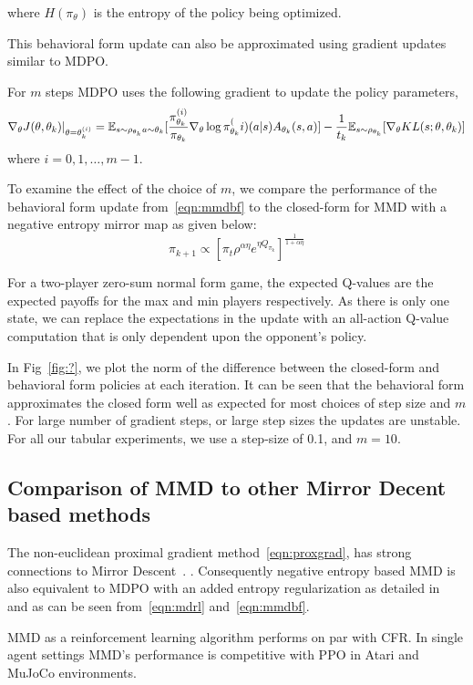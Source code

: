 where $H(\pi_\theta)$ is the entropy of the policy
being optimized.

This behavioral form update can also be approximated using gradient updates similar to MDPO. 

For $m$ steps MDPO uses the following gradient to update the policy parameters, 
\begin{equation}
	\label{eqn:mdpograd}
	\nabla_{\theta} J(\theta, \theta_k)|_{\theta = \theta_k^{(i)}} = \mathbb{E}_{s \sim \rho_{\theta_k} \\ a \sim \theta_k} 
	[\frac{\pi_{\theta_k}^{(i)}}{\pi_{\theta_k}} \nabla_{\theta} \log \pi_{\theta_k}^(i) (a|s) A_{\theta_k}(s,a)] - 
	\frac{1}{t_k} \mathbb{E}_{s \sim \rho_{\theta_k}} [\nabla_\theta KL(s; \theta, \theta_k)]
\end{equation}
where $i=0,1,\ldots,m-1$.

To examine the effect of the choice of $m$, we compare the performance of the behavioral form update from~\ref{eqn:mmdbf}  
to the closed-form for MMD with a negative entropy mirror map as given below:
$$\pi_{k+1} \propto [\pi_t \rho^{\alpha \eta} e^{\eta Q_{\pi_k}}]^{\frac{1}{1+\alpha \eta}}$$

For a two-player zero-sum normal form game, the expected Q-values are the expected payoffs for the max and min players respectively.
As there is only one state, we can replace the expectations in the update with an all-action Q-value computation that is only dependent 
upon the opponent's policy. 

In Fig~\ref{fig:?}, we plot the norm of the difference between the closed-form and behavioral form policies at each iteration. 
It can be seen that the behavioral form approximates the closed form well as expected for most choices of step size and $m$. 
For large number of gradient steps, or large step sizes the updates are unstable. 
For all our tabular experiments, we use a step-size of 0.1, and $m=10$.

\subsection{Comparison of MMD to other Mirror Decent based methods}

The non-euclidean proximal gradient method~\ref{eqn:proxgrad}, has strong connections to Mirror Descent~\cite[Appendix D.3]{sokotaUnified2023}.
.
Consequently negative entropy based MMD is also equivalent to MDPO with an added entropy regularization 
as detailed in~\cite[Appendix L]{sokotaUnified2023} and as can be seen from~\ref{eqn:mdrl} and~\ref{eqn:mmdbf}.


MMD as a reinforcement learning algorithm performs on par with CFR.
In single agent settings MMD's performance is competitive with PPO in Atari and MuJoCo
environments.